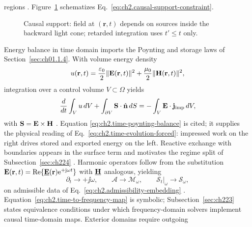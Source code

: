 regions \cite{stratton1941}. Figure~\ref{fig:ch2.causal-light-cone}
schematizes Eq.~\eqref{eq:ch2.causal-support-constraint}.
\begin{figure}[t]
\centering
{}
\caption{Causal support: field at \((\mathbf{r},t)\) depends on sources inside the
backward light cone; retarded integration uses \(t'\le t\) only.}
\label{fig:ch2.causal-light-cone}
\end{figure}
Energy balance in time domain imports the Poynting and storage laws of
Section~\ref{sec:ch01.1.4}. With volume energy density
\begin{equation}
\label{eq:ch2.time-energy-density}
u(\mathbf{r},t)
=
\frac{\varepsilon_0}{2}\|\mathbf{E}(\mathbf{r},t)\|^2
+\frac{\mu_0}{2}\|\mathbf{H}(\mathbf{r},t)\|^2,
\end{equation}
integration over a control volume \(V\subset\Omega\) yields
\begin{equation}
\label{eq:ch2.time-poynting-balance}
\frac{d}{dt}\int_V u\,dV
+\int_{\partial V}\mathbf{S}\cdot\hat{\mathbf{n}}\,dS
=
-\int_V \mathbf{E}\cdot\mathbf{j}_{\mathrm{imp}}\,dV,
\end{equation}
with \(\mathbf{S}=\mathbf{E}\times\mathbf{H}\) \cite{stratton1941}. Equation
\eqref{eq:ch2.time-poynting-balance} is cited; it supplies the physical
reading of Eq.~\eqref{eq:ch2.time-evolution-forced}: impressed work on the right
drives stored and exported energy on the left. Reactive exchange with boundaries
appears in the surface term and motivates the regime split of
Subsection~\ref{sec:ch224} \cite{harrington2001}. Harmonic operators follow from the substitution
\(\mathbf{E}(\mathbf{r},t)=\Re\{\underline{\mathbf{E}}(\mathbf{r})\mathrm{e}^{+\mathrm{j}\omega t}\}\) with
\(\underline{\mathbf{H}}\) analogous, yielding
\begin{equation}
\label{eq:ch2.time-to-frequency-map}
\partial_t \longrightarrow +\jj\omega,
\qquad
\mathcal{A}\longrightarrow \mathcal{M}_\omega,
\qquad
\mathcal{S}_t\big|_{\omega}\longrightarrow \mathcal{S}_\omega,
\end{equation}
on admissible data of Eq.~\eqref{eq:ch2.admissibility-embedding}
\cite{stratton1941}. Equation~\eqref{eq:ch2.time-to-frequency-map} is symbolic;
Subsection~\ref{sec:ch223} states equivalence conditions under which frequency-domain
solvers implement causal time-domain maps. Exterior domains require outgoing
